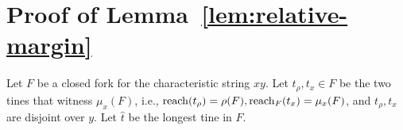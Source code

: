 




\section{Proof of Lemma~\ref{lem:relative-margin}}

Let $F$ be a closed fork for the characteristic string $xy$. 
Let $t_\rho, t_x \in F$ be the two tines that witness $\mu_x(F)$, 
i.e., $\operatorname{reach}(t_\rho) = \rho(F), \operatorname{reach}_F(t_x) = \mu_x(F)$, 
and $t_\rho, t_x$ are disjoint over $y$. 
Let $\hat{t}$ be the longest tine in $F$.

